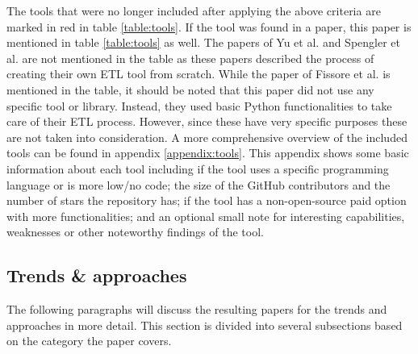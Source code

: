\documentclass[11pt]{article}
\begin{document}
The tools that were no longer included after applying the above criteria are marked in red in table \ref{table:tools}. If the tool was found in a paper, this paper is mentioned in table \ref{table:tools} as well. The papers of Yu et al. and Spengler et al. \cite{Yu2022, Spengler2020415} are not mentioned in the table as these papers described the process of creating their own ETL tool from scratch. While the paper of Fissore et al. is mentioned in the table, it should be noted that this paper did not use any specific tool or library. Instead, they used basic Python functionalities to take care of their ETL process. However, since these have very specific purposes these are not taken into consideration. A more comprehensive overview of the included tools can be found in appendix \ref{appendix:tools}. This appendix shows some basic information about each tool including if the tool uses a specific programming language or is more low/no code; the size of the GitHub contributors and the number of stars the repository has; if the tool has a non-open-source paid option with more functionalities; and an optional small note for interesting capabilities, weaknesses or other noteworthy findings of the tool. \\ 


\subsection{Trends \& approaches}
\label{results:trends}
The following paragraphs will discuss the resulting papers for the trends and approaches in more detail. This section is divided into several subsections based on the category the paper covers.
\end{document}
